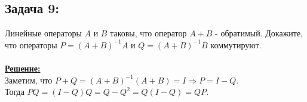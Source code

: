 \documentclass[a4paper,12pt,titlepage,final]{article}
\begin{document}
\subsection*{Задача 9:}
\noindent Линейные операторы $A$ и $B$ таковы, что оператор $A + B$ - обратимый. Докажите, что операторы
$P = (A + B)^{-1}A$ и $Q = (A + B)^{-1}B$ коммутируют. \\ \\
\textbf{\underline{Решение:}} \\
Заметим, что $P + Q = (A + B)^{-1}(A + B) = I \Rightarrow P = I - Q$. \\
Тогда $PQ = (I - Q)Q = Q - Q^2 = Q(I - Q) = QP$. \\ \\ \\ 
\end{document}
